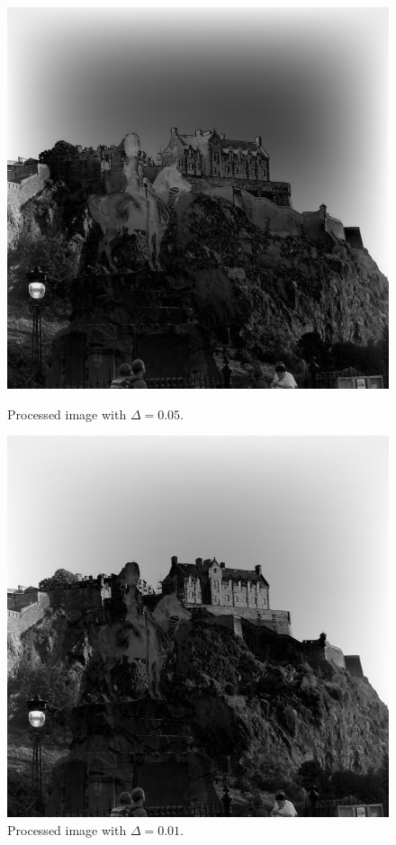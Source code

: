 \documentclass[11pt]{article}
\begin{document}
	\begin{figure}[H]	
		\centering
		\begin{minipage}[b]{.5\textwidth}
			\centering
			\includegraphics[scale=0.23]{edge768x768_050.jpg}
			\caption{Processed image with $\Delta=0.05$.}\label{pic5}
		\end{minipage}%
		\begin{minipage}[b]{.5\textwidth}
			\centering
			\includegraphics[scale=0.23]{edge768x768_010.jpg}
			\caption{Processed image with $\Delta=0.01$.}\label{pic1}
		\end{minipage}
	\end{figure}
\end{document}
